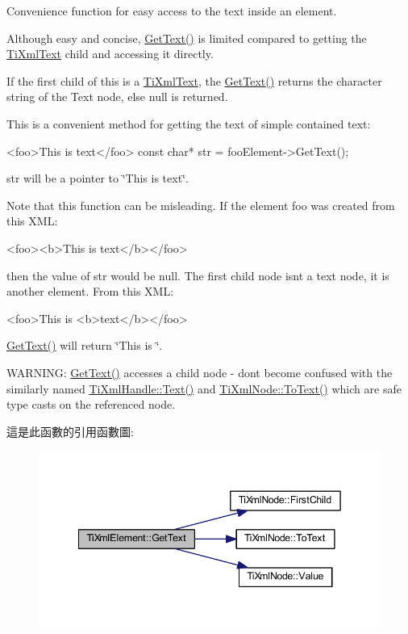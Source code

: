 Convenience function for easy access to the text inside an element. 

Although easy and concise, \hyperlink{class_ti_xml_element_aa6dedd8a146acf3b1bc0903deb2d411a}{Get\+Text()} is limited compared to getting the \hyperlink{class_ti_xml_text}{Ti\+Xml\+Text} child and accessing it directly.

If the first child of \textquotesingle{}this\textquotesingle{} is a \hyperlink{class_ti_xml_text}{Ti\+Xml\+Text}, the \hyperlink{class_ti_xml_element_aa6dedd8a146acf3b1bc0903deb2d411a}{Get\+Text()} returns the character string of the Text node, else null is returned.

This is a convenient method for getting the text of simple contained text\+: \begin{DoxyVerb}<foo>This is text</foo>
const char* str = fooElement->GetText();
\end{DoxyVerb}


\textquotesingle{}str\textquotesingle{} will be a pointer to \char`\"{}\+This is text\char`\"{}.

Note that this function can be misleading. If the element foo was created from this X\+ML\+: \begin{DoxyVerb}<foo><b>This is text</b></foo> 
\end{DoxyVerb}


then the value of str would be null. The first child node isn\textquotesingle{}t a text node, it is another element. From this X\+ML\+: \begin{DoxyVerb}<foo>This is <b>text</b></foo> 
\end{DoxyVerb}
 \hyperlink{class_ti_xml_element_aa6dedd8a146acf3b1bc0903deb2d411a}{Get\+Text()} will return \char`\"{}\+This is \char`\"{}.

W\+A\+R\+N\+I\+NG\+: \hyperlink{class_ti_xml_element_aa6dedd8a146acf3b1bc0903deb2d411a}{Get\+Text()} accesses a child node -\/ don\textquotesingle{}t become confused with the similarly named \hyperlink{class_ti_xml_handle_a9fc739c8a18d160006f82572fc143d13}{Ti\+Xml\+Handle\+::\+Text()} and \hyperlink{class_ti_xml_node_a3ddfbcac78fbea041fad57e5c6d60a03}{Ti\+Xml\+Node\+::\+To\+Text()} which are safe type casts on the referenced node. 

這是此函數的引用函數圖\+:\nopagebreak
\begin{figure}[H]
\begin{center}
\leavevmode
\includegraphics[width=342pt]{class_ti_xml_element_aa6dedd8a146acf3b1bc0903deb2d411a_cgraph}
\end{center}
\end{figure}


